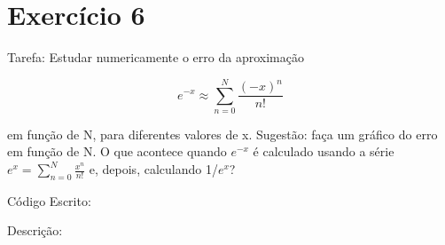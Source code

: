 \documentclass[12pt, a4paper]{article} %
\begin{document}
\section{Exerc\'icio 6}

Tarefa: Estudar numericamente o erro da aproxima\c{c}\~ao

\begin{equation} e^{-x} \approx \sum_{n=0}^N \frac{(-x)^n}{n!} \end{equation}

em fun\c{c}\~ao de N, para diferentes valores de x. Sugest\~ao: fa\c{c}a um gr\'afico do erro em fun\c{c}\~ao de N. O que acontece quando $e^{-x}$  \'e calculado usando a s\'erie $e^x = \sum_{n=0}^{N} \frac{x^n}{n!}$ e, depois, calculando 1/$e^x$?

C\'odigo Escrito:


Descri\c{c}\~ao:
\end{document}
